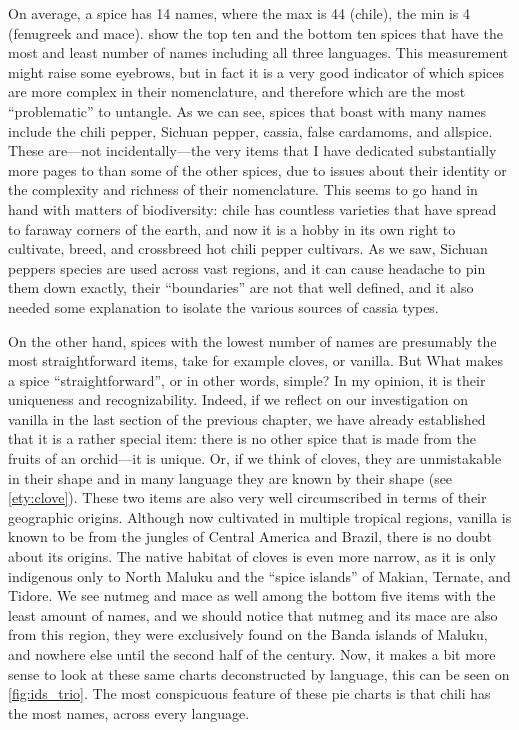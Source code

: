 On average, a spice has 14 names, where the max is 44 (chile), the min is 4 (fenugreek and mace).  show the top ten and the bottom ten spices that have the most and least number of names including all three languages. This measurement might raise some eyebrows, but in fact it is a very good indicator of which spices are more complex in their nomenclature, and therefore which are the most ``problematic'' to untangle. As we can see, spices that boast with many names include the chili pepper, Sichuan pepper, cassia, false cardamoms, and allspice. These are---not incidentally---the very items that I have dedicated substantially more pages to than some of the other spices, due to issues about their identity or the complexity and richness of their nomenclature. This seems to go hand in hand with matters of biodiversity: chile has countless varieties that have spread to faraway corners of the earth, and now it is a hobby in its own right to cultivate, breed, and crossbreed hot chili pepper cultivars. As we saw, Sichuan peppers species are used across vast regions, and it can cause headache to pin them down exactly, their ``boundaries'' are not that well defined, and it also needed some explanation to isolate the various sources of cassia types.

On the other hand, spices with the lowest number of names are presumably the most straightforward items, take for example cloves, or vanilla. But What makes a spice ``straightforward'', or in other words, simple? In my opinion, it is their uniqueness and recognizability. Indeed, if we reflect on our investigation on vanilla in the last section of the previous chapter, we have already established that it is a rather special item: there is no other spice that is made from the fruits of an orchid---it is unique. Or, if we think of cloves, they are unmistakable in their shape and in many language they are known by their shape (see \ref{ety:clove}). These two items are also very well circumscribed in terms of their geographic origins. Although now cultivated in multiple tropical regions, vanilla is known to be from the jungles of Central America and Brazil, there is no doubt about its origins. The native habitat of cloves is even more narrow, as it is only indigenous only to North Maluku and the ``spice islands'' of Makian, Ternate, and Tidore. We see nutmeg and mace as well among the bottom five items with the least amount of names, and we should notice that nutmeg and its mace are also from this region, they were exclusively found on the Banda islands of Maluku, and nowhere else until the second half of the  century. Now, it makes a bit more sense to look at these same charts deconstructed by language, this can be seen on \cref{fig:ids_trio}. The most conspicuous feature of these pie charts is that chili has the most names, across every language.

